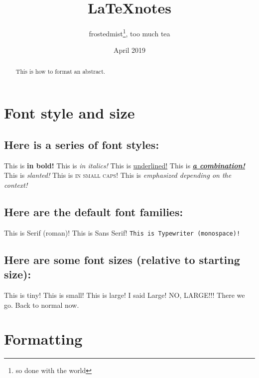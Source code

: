 \documentclass[12pt, letterpaper]{article} %
\title{\LaTeX notes} %
\author{frostedmist\thanks{so done with the world}, too much tea} %
\date{April 2019} %
\begin{document}

\maketitle %

\section{Font style and size}

\subsection*{Here is a series of font styles:}

This is \textbf{in bold!} 
This is \textit{in italics!}
This is \underline{underlined!}
This is \textbf{\textit{\underline{a combination!}}}
This is \textsl{slanted!}
This is \textsc{in small caps!}
This is \emph{emphasized depending on the context!} %

\subsection*{Here are the default font families:}

\textrm{This is Serif (roman)!}
\textsf{This is Sans Serif!}
\texttt{This is Typewriter (monospace)!}

\subsection*{Here are some font sizes (relative to starting size):} %

\tiny{This is tiny!}
\small{This is small!}
\large{This is large!}
\Large{I said Large!}
\LARGE{NO, LARGE!!!}
\huge{There we go.}
\normalsize{Back to normal now.}

\clearpage %

\section{Formatting}

\begin{abstract}
	This is how to format an abstract.
\end{abstract}
\end{document}
